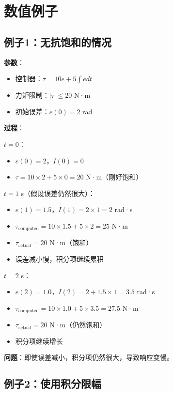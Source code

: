 \documentclass[12pt,a4paper]{article}
\begin{document}
\section{数值例子}

\subsection{例子1：无抗饱和的情况}

\textbf{参数}：
\begin{itemize}
\item 控制器：$\tau = 10e + 5\int e dt$
\item 力矩限制：$|\tau| \leq 20$ N·m
\item 初始误差：$e(0) = 2$ rad
\end{itemize}

\textbf{过程}：

$t = 0$：
\begin{itemize}
\item $e(0) = 2$，$I(0) = 0$
\item $\tau = 10 \times 2 + 5 \times 0 = 20$ N·m（刚好饱和）
\end{itemize}

$t = 1$ s（假设误差仍然很大）：
\begin{itemize}
\item $e(1) = 1.5$，$I(1) = 2 \times 1 = 2$ rad·s
\item $\tau_{\text{computed}} = 10 \times 1.5 + 5 \times 2 = 25$ N·m
\item $\tau_{\text{actual}} = 20$ N·m（饱和）
\item 误差减小慢，积分项继续累积
\end{itemize}

$t = 2$ s：
\begin{itemize}
\item $e(2) = 1.0$，$I(2) = 2 + 1.5 \times 1 = 3.5$ rad·s
\item $\tau_{\text{computed}} = 10 \times 1.0 + 5 \times 3.5 = 27.5$ N·m
\item $\tau_{\text{actual}} = 20$ N·m（仍然饱和）
\item 积分项继续增长
\end{itemize}

\textbf{问题}：即使误差减小，积分项仍然很大，导致响应变慢。

\subsection{例子2：使用积分限幅}
\end{document}
